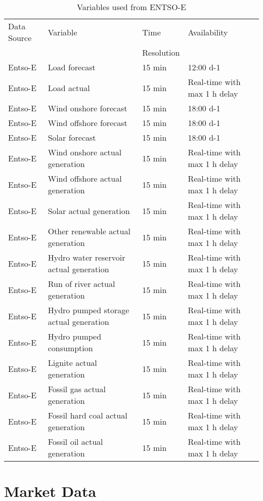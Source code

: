 \documentclass[class=scrbook, crop=false]{standalone}
\begin{document}
\begin{table}[]
\centering
\begin{tabular}{l|l|l|l}
 Data Source & Variable &  Time  & Availability  \\
 &&Resolution&\\\hline
 Entso-E & Load forecast & 15 min  & 12:00 d-1 \\
 Entso-E & Load actual & 15 min  & Real-time with max 1 h delay \\
 Entso-E & Wind onshore forecast & 15 min  & 18:00 d-1\\
 Entso-E & Wind offshore forecast & 15 min & 18:00 d-1 \\
 Entso-E & Solar forecast & 15 min & 18:00 d-1 \\
 Entso-E & Wind onshore actual generation & 15 min  & Real-time with max 1 h delay\\
 Entso-E & Wind offshore actual generation & 15 min & Real-time with max 1 h delay \\
 Entso-E & Solar actual generation & 15 min & Real-time with max 1 h delay \\
 Entso-E & Other renewable actual generation & 15 min & Real-time with max 1 h delay \\
 Entso-E & Hydro water reservoir actual generation & 15 min & Real-time with max 1 h delay \\
 Entso-E & Run of river actual generation & 15 min & Real-time with max 1 h delay \\
 Entso-E & Hydro pumped storage actual generation & 15 min & Real-time with max 1 h delay \\
 Entso-E & Hydro pumped consumption & 15 min & Real-time with max 1 h delay \\
 Entso-E & Lignite actual generation & 15 min & Real-time with max 1 h delay \\
 Entso-E & Fossil gas actual generation & 15 min & Real-time with max 1 h delay \\
 Entso-E & Fossil hard coal actual generation & 15 min & Real-time with max 1 h delay \\
 Entso-E & Fossil oil actual generation & 15 min & Real-time with max 1 h delay \\
  
\end{tabular}
\caption{Variables used from ENTSO-E}
\label{Table::Energy_Data_Entsoe}
\end{table}

\section{Market Data}
\label{Section::Market_Data}
\end{document}
